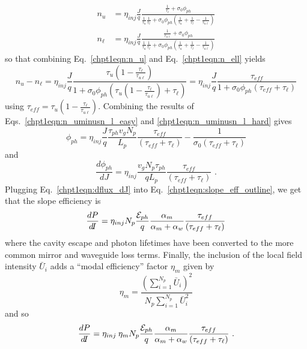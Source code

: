 \documentclass[12pt]{report}
\begin{document}
{%
\begin{subequations}
\begin{align}
\label{chpt1eqn:n_u}
n_u &= \eta_{inj}\frac{J}{q} \frac{\frac{1}{\tau_\ell}+\sigma_0 \phi_{ph}}{\frac{1}{\tau_u} \frac{1}{\tau_\ell}+\sigma_0 \phi_{ph} \left(\frac{1}{\tau_u} + \frac{1}{\tau_\ell} - \frac{1}{\tau_{u\ell}} \right)} \\
\label{chpt1eqn:n_ell}
n_\ell &= \eta_{inj}\frac{J}{q} \frac{\frac{1}{\tau_{u\ell}}+\sigma_0 \phi_{ph}}{\frac{1}{\tau_u} \frac{1}{\tau_\ell}+\sigma_0 \phi_{ph} \left(\frac{1}{\tau_u} + \frac{1}{\tau_\ell} - \frac{1}{\tau_{u\ell}} \right)}
\end{align}
\end{subequations}
so that combining Eq.~\eqref{chpt1eqn:n_u} and Eq.~\eqref{chpt1eqn:n_ell} yields
\begin{equation}
\label{chpt1eqn:n_uminusn_l_hard}
n_u-n_\ell = \eta_{inj}\frac{J}{q}  \frac{\tau_u \left(1-\frac{\tau_\ell}{\tau_{u\ell}}\right)}{1+\sigma_0 \phi_{ph} \left(\tau_u \left(1-\frac{\tau_\ell}{\tau_{u\ell}}\right) + \tau_\ell\right)} = \eta_{inj}\frac{J}{q}  \frac{\tau_{eff}}{1+\sigma_0 \phi_{ph} \left(\tau_{eff} + \tau_\ell\right)}
\end{equation}
using $\tau_{eff}=\tau_u\left(1-\frac{\tau_\ell}{\tau_{u\ell}}\right)$.
Combining the results of Eqs.~\eqref{chpt1eqn:n_uminusn_l_easy} and \eqref{chpt1eqn:n_uminusn_l_hard} gives
\begin{equation}
\phi_{ph} = \eta_{inj} \frac{J}{q} \frac{\tau_{ph} v_g N_p}{L_p} \frac{\tau_{eff}}{\left(\tau_{eff}+\tau_\ell\right)} - \frac{1}{\sigma_0 \left(\tau_{eff}+\tau_\ell\right)}
\end{equation}
and
\begin{equation}
\label{chpt1eqn:dflux_dJ}
\frac{d \phi_{ph}}{d\!J} = \eta_{inj} \frac{v_g N_p \tau_{ph}}{q L_p} \frac{\tau_{eff}}{\left(\tau_{eff}+\tau_\ell\right)} \text{~.}
\end{equation}
Plugging Eq.~\eqref{chpt1eqn:dflux_dJ} into Eq.~\eqref{chpt1eqn:slope_eff_outline}, we get that the slope efficiency is
\begin{equation}
\frac{d P}{d\!I} = \eta_{inj} N_p \frac{\EE_{ph}}{q} \frac{\alpha_m}{\alpha_m+\alpha_w}  \frac{\tau_{eff}}{\left(\tau_{eff}+\tau_{\ell}\right)}
\end{equation}
where the cavity escape and photon lifetimes have been converted to the more common mirror and waveguide loss terms.  Finally, the inclusion of the local field intensity $\bar{U}_i$ adds a ``modal efficiency'' factor $\eta_m$ given by \cite{Gresch:PTL:2006}
\begin{equation}
\eta_m = \frac{\left(\sum_{i=1}^{N_p} \bar{U}_i\right)^2}{N_p \sum_{i=1}^{N_p} \bar{U}_i^2}
\end{equation}
and so
\begin{equation}
\frac{d P}{d\!I} = \eta_{inj} \: \eta_m N_p \frac{\EE_{ph}}{q} \frac{\alpha_m}{\alpha_m+\alpha_w}  \frac{\tau_{eff}}{\left(\tau_{eff}+\tau_{\ell}\right)} {~.}
\end{equation}

}
\end{document}
